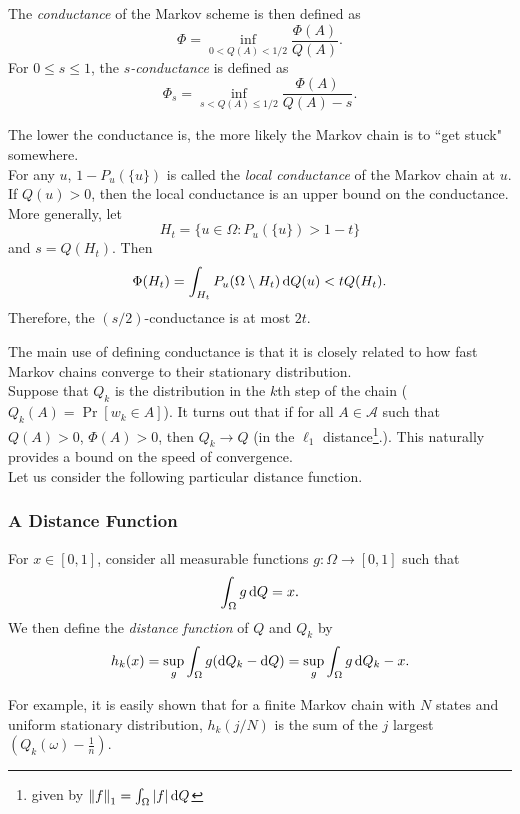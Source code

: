 \begin{fdef}
	\label{def: conductance}
	The \textit{conductance} of the Markov scheme is then defined as
	\[ \Phi = \inf_{0<Q(A)<1/2} \frac{\Phi(A)}{Q(A)}. \]
	For $0\leq s\leq 1$, the \textit{$s$-conductance} is defined as
	\[ \Phi_s = \inf_{s < Q(A) \leq 1/2} \frac{\Phi(A)}{Q(A)-s}. \]
\end{fdef}

The lower the conductance is, the more likely the Markov chain is to ``get stuck" somewhere.\\

For any $u$, $1-P_u(\{u\})$ is called the \textit{local conductance} of the Markov chain at $u$. If $Q(u)>0$, then the local conductance is an upper bound on the conductance.\\
More generally, let
\[ H_t = \{u\in\Omega:P_u(\{u\}) > 1-t\} \]
and $s=Q(H_t)$. Then
\[ \Phi(H_t) = \int_{H_t} P_u(\Omega\setminus H_t)\operatorname{d}\!{Q}(u) < t Q(H_t). \]
Therefore, the $(s/2)$-conductance is at most $2t$.

The main use of defining conductance is that it is closely related to how fast Markov chains converge to their stationary distribution.\\
Suppose that $Q_k$ is the distribution in the $k$th step of the chain ($Q_k(A)=\Pr[w_k\in A]$). It turns out that if for all $A\in\mathcal{A}$ such that $Q(A)>0$, $\Phi(A)>0$, then $Q_k\to Q$ (in the $\ell_1$ distance\footnote{given by $\left\lVert f\right\rVert_1 = \int_\Omega |f|\operatorname{d}\!{Q}$}.). This naturally provides a bound on the speed of convergence.\\
Let us consider the following particular distance function.

\subsubsection{A Distance Function}

\begin{fdef}
For $x\in[0,1]$, consider all measurable functions $g:\Omega\to[0,1]$ such that
\[ \int_{\Omega} g\operatorname{d}\!{Q} = x. \]
We then define the \textit{distance function} of $Q$ and $Q_k$ by
\[ h_k(x) = \sup_g \int_\Omega g(\operatorname{d}\!{Q}_k-\operatorname{d}\!{Q}) = \sup_g \int_\Omega g\operatorname{d}\!{Q}_k - x. \]
\end{fdef}

For example, it is easily shown that for a finite Markov chain with $N$ states and uniform stationary distribution, $h_k(j/N)$ is the sum of the $j$ largest $\left(Q_k(\omega)-\frac{1}{n}\right)$.\\

